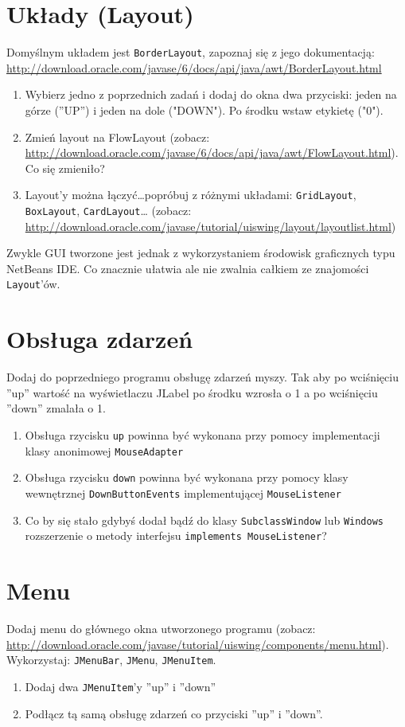 \documentclass[12pt,letterpaper]{article}
\begin{document}
\section{Układy (Layout)}
Domyślnym układem jest \verb+BorderLayout+, zapoznaj się z jego
dokumentacją:
\url{http://download.oracle.com/javase/6/docs/api/java/awt/BorderLayout.html}
\begin{enumerate}
\item Wybierz jedno z poprzednich zadań i dodaj do okna dwa przyciski:
  jeden na górze (''UP'') i jeden na dole ("DOWN"). Po środku wstaw
  etykietę ("0").
\item Zmień layout na FlowLayout (zobacz:
  \url{http://download.oracle.com/javase/6/docs/api/java/awt/FlowLayout.html}). 
Co się zmieniło?
\item Layout'y można łączyć\ldots popróbuj z różnymi układami:
  \verb+GridLayout+, \verb+BoxLayout+, \verb+CardLayout+\ldots
  (zobacz: \url{http://download.oracle.com/javase/tutorial/uiswing/layout/layoutlist.html})
\end{enumerate}
Zwykle GUI tworzone jest jednak z wykorzystaniem środowisk graficznych
typu NetBeans IDE. Co znacznie ułatwia ale nie zwalnia całkiem ze
znajomości \verb+Layout+'ów.

\section{Obsługa zdarzeń}
\label{sec:obsuga-zdarze}

Dodaj do poprzedniego programu obsługę zdarzeń myszy. Tak aby po
wciśnięciu ''up'' wartość na wyświetlaczu JLabel po środku wzrosła o 1
a po wciśnięciu ''down'' zmalała o 1.
\begin{enumerate}
\item Obsługa rzycisku \verb+up+ powinna być wykonana przy pomocy
  implementacji klasy anonimowej \verb+MouseAdapter+
\item Obsługa rzycisku \verb+down+ powinna być wykonana przy pomocy
  klasy wewnętrznej \verb+DownButtonEvents+ implementującej
  \verb+MouseListener+
\item Co by się stało gdybyś dodał bądź do klasy \verb+SubclassWindow+
  lub \verb+Windows+ rozszerzenie o metody interfejsu \verb+implements MouseListener+? 
\end{enumerate}


\section{Menu}
\label{sec:menu}

Dodaj menu do głównego okna utworzonego programu (zobacz:
\url{http://download.oracle.com/javase/tutorial/uiswing/components/menu.html}).
Wykorzystaj: \verb+JMenuBar+, \verb+JMenu+, \verb+JMenuItem+.
\begin{enumerate}
\item Dodaj dwa \verb+JMenuItem+'y ''up'' i ''down''
\item Podłącz tą samą obsługę zdarzeń co przyciski ''up'' i ''down''.
\end{enumerate}
\end{document}
